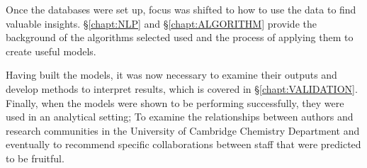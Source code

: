 Once the databases were set up, focus was shifted to how to use the data to find valuable insights. \S \ref{chapt:NLP} and \S \ref{chapt:ALGORITHM} provide the background of the algorithms selected used and the process of applying them to create useful models. 

Having built the models, it was now necessary to examine their outputs and develop methods to interpret results, which is covered in \S \ref{chapt:VALIDATION}. Finally, when the models were shown to be performing successfully, they were used in an analytical setting; To examine the relationships between authors and research communities in the University of Cambridge Chemistry Department and eventually to recommend specific collaborations between staff that were predicted to be fruitful.
 
